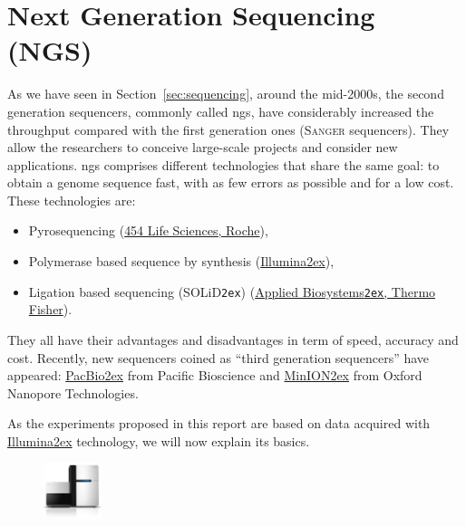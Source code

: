 \section{Next Generation Sequencing (NGS)}\label{sec:ngs}
As we have seen in Section~\ref{sec:sequencing}, around the mid-2000s, the second generation sequencers, commonly called \gls{ngs}, have considerably increased the throughput compared with the first generation ones (\textsc{Sanger} sequencers). They allow the researchers to conceive large-scale projects and consider new applications.
\gls{ngs} comprises different technologies that share the same goal: to obtain a genome sequence fast, with as few errors as possible and for a low cost.
These technologies are:

\begin{itemize}
    \item Pyrosequencing (\href{http://www.454.com/}{454 Life Sciences, Roche}),
    \item Polymerase based sequence by synthesis (\href{http://www.illumina.com/}{Illumina\ttfamily\tiny\raise2ex\hbox{\textregistered}}),
    \item Ligation based sequencing (SOLiD\texttt{\tiny\raise2ex\hbox{\texttrademark}}) (\href{http://www.appliedbiosystems.com/absite/us/en/home.html}{Applied Biosystems\texttt{\tiny\raise2ex\hbox{\texttrademark}}, Thermo Fisher}).
\end{itemize}

They all have their advantages and disadvantages in term of speed, accuracy and cost.
Recently, new sequencers coined as ``third generation sequencers'' have appeared:
\href{http://www.pacificbiosciences.com/}{PacBio\ttfamily\tiny\raise2ex\hbox{\textregistered}} from Pacific Bioscience and \href{https://nanoporetech.com/products-services/minion-mki}{MinION\ttfamily\tiny\raise2ex\hbox{\texttrademark}} from Oxford Nanopore Technologies.

As the experiments proposed in this report are based on data acquired with \href{http://www.illumina.com/}{Illumina\ttfamily\tiny\raise2ex\hbox{\textregistered}} technology, we will now explain its basics.
\pagebreak

\begin{figure}
    \vspace{-1.9em}
    \includegraphics[width=0.15\textwidth]{img/illumina}
\end{figure}

